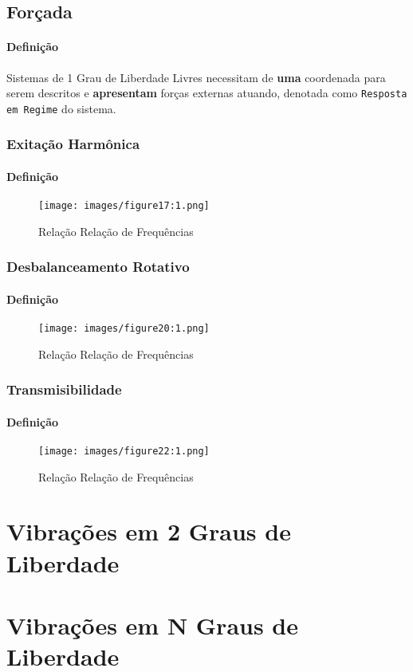 \documentclass{article}
\begin{document}
\newpage\subsection{Forçada}
    \paragraph{Definição}Sistemas de 1 Grau de Liberdade Livres necessitam de \textbf{uma} coordenada para serem descritos e \textbf{apresentam} forças externas atuando, denotada como \texttt{Resposta em Regime} do sistema.

\subsubsection{Exitação Harmônica}
    \paragraph{Definição}
    \begin{figure}[H]
        \centering
        \texttt{[image: images/figure17:1.png]}
        \caption{Relação Relação de Frequências}
    \end{figure} \noindent

\subsubsection{Desbalanceamento Rotativo}
    \paragraph{Definição}
    \begin{figure}[H]
        \centering
        \texttt{[image: images/figure20:1.png]}
        \caption{Relação Relação de Frequências}
    \end{figure} \noindent

\subsubsection{Transmisibilidade}
    \paragraph{Definição}
    \begin{figure}[H]
        \centering
        \texttt{[image: images/figure22:1.png]}
        \caption{Relação Relação de Frequências}
    \end{figure} \noindent



\newpage\section{Vibrações em 2 Graus de Liberdade}



\newpage\section{Vibrações em N Graus de Liberdade}
\end{document}

